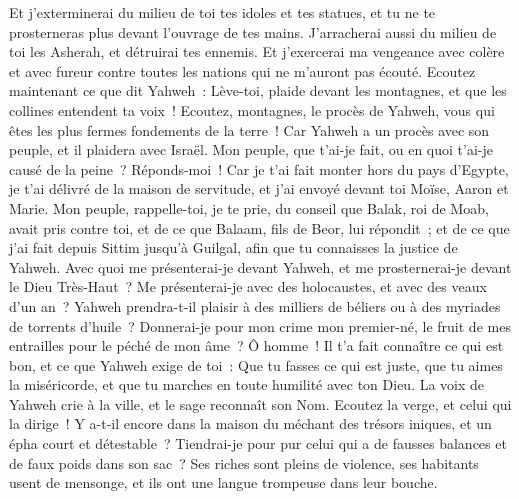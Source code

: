 \begin{multicols}{2}
Et j'exterminerai du milieu de toi tes idoles et tes statues, et tu ne te prosterneras plus devant l'ouvrage de tes mains.
J'arracherai aussi du milieu de toi les Asherah, et détruirai tes ennemis.
Et j'exercerai ma vengeance avec colère et avec fureur contre toutes les nations qui ne m'auront pas écouté.
\VerseOne{}Ecoutez maintenant ce que dit Yahweh~: Lève-toi, plaide devant les montagnes, et que les collines entendent ta voix~!
Ecoutez, montagnes, le procès de Yahweh, vous qui êtes les plus fermes fondements de la terre~! Car Yahweh a un procès avec son peuple, et il plaidera avec Israël.
Mon peuple, que t'ai-je fait, ou en quoi t'ai-je causé de la peine~? Réponds-moi~!
Car je t'ai fait monter hors du pays d'Egypte, je t'ai délivré de la maison de servitude, et j'ai envoyé devant toi Moïse, Aaron et Marie.
Mon peuple, rappelle-toi, je te prie, du conseil que Balak, roi de Moab, avait pris contre toi, et de ce que Balaam, fils de Beor, lui répondit~; et de ce que j'ai fait depuis Sittim jusqu'à Guilgal, afin que tu connaisses la justice de Yahweh.
Avec quoi me présenterai-je devant Yahweh, et me prosternerai-je devant le Dieu Très-Haut~? Me présenterai-je avec des holocaustes, et avec des veaux d'un an~?
Yahweh prendra-t-il plaisir à des milliers de béliers ou à des myriades de torrents d'huile~? Donnerai-je pour mon crime mon premier-né, le fruit de mes entrailles pour le péché de mon âme~?
Ô homme~! Il t'a fait connaître ce qui est bon, et ce que Yahweh exige de toi~: Que tu fasses ce qui est juste, que tu aimes la miséricorde, et que tu marches en toute humilité avec ton Dieu.
La voix de Yahweh crie à la ville, et le sage reconnaît son Nom. Ecoutez la verge, et celui qui la dirige~!
Y a-t-il encore dans la maison du méchant des trésors iniques, et un épha court et détestable~?
Tiendrai-je pour pur celui qui a de fausses balances et de faux poids dans son sac~?
Ses riches sont pleins de violence, ses habitants usent de mensonge, et ils ont une langue trompeuse dans leur bouche.

\end{multicols}
